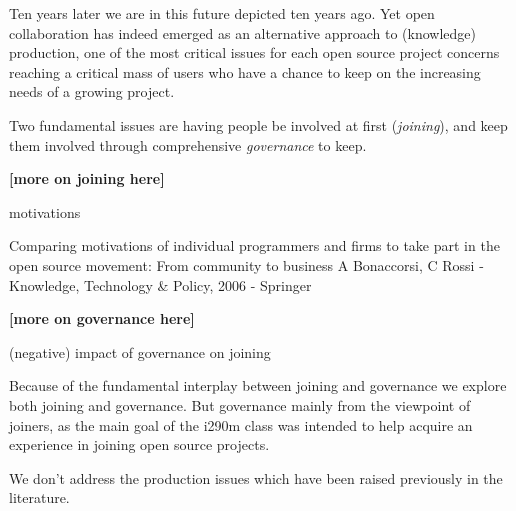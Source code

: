 Ten years later we are in this future depicted ten years ago. Yet open collaboration has indeed emerged as an alternative approach to (knowledge) production, one of the most critical issues for each open source project concerns reaching a critical mass of users who have a chance to keep on the increasing needs of a growing project. 

Two fundamental issues are having people be involved at first ({\it joining}), and keep them involved through comprehensive {\it governance} to keep.

{\bf [more on joining here]}

motivations

Comparing motivations of individual programmers and firms to take part in the open source movement: From community to business
A Bonaccorsi, C Rossi - Knowledge, Technology \& Policy, 2006 - Springer


{\bf [more on governance here]} 

 \cite{O'Mahony2007}

(negative) impact of governance on joining \cite{halfacker2013}

Because of the fundamental interplay between joining and governance we explore both joining and governance. But governance mainly from the viewpoint of joiners, as the main goal of the i290m class was intended to help acquire an experience in joining open source projects.

We don't address the production issues which have been raised previously in the literature.


\cite{tomlinson2012}

